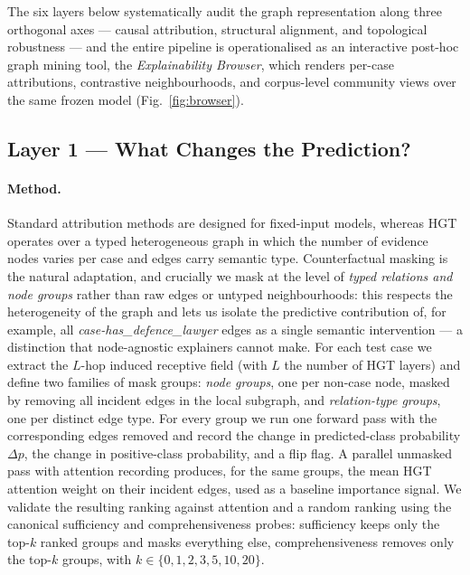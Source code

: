 \documentclass[runningheads]{llncs}
\begin{document}
The six layers below systematically audit the graph representation along three orthogonal axes --- causal attribution, structural alignment, and topological robustness --- and the entire pipeline is operationalised as an interactive post-hoc graph mining tool, the \emph{Explainability Browser}, which renders per-case attributions, contrastive neighbourhoods, and corpus-level community views over the same frozen model (Fig.~\ref{fig:browser}).


\subsection{Layer 1 --- What Changes the Prediction?}
\label{subsec:exp-attribution}

\paragraph{Method.} Standard attribution methods are designed for fixed-input models, whereas HGT operates over a typed heterogeneous graph in which the number of evidence nodes varies per case and edges carry semantic type. Counterfactual masking is the natural adaptation, and crucially we mask at the level of \emph{typed relations and node groups} rather than raw edges or untyped neighbourhoods: this respects the heterogeneity of the graph and lets us isolate the predictive contribution of, for example, all \emph{case-has\_defence\_lawyer} edges as a single semantic intervention --- a distinction that node-agnostic explainers cannot make. For each test case we extract the $L$-hop induced receptive field (with $L$ the number of HGT layers) and define two families of mask groups: \emph{node groups}, one per non-case node, masked by removing all incident edges in the local subgraph, and \emph{relation-type groups}, one per distinct edge type. For every group we run one forward pass with the corresponding edges removed and record the change in predicted-class probability $\Delta p$, the change in positive-class probability, and a flip flag. A parallel unmasked pass with attention recording produces, for the same groups, the mean HGT attention weight on their incident edges, used as a baseline importance signal. We validate the resulting ranking against attention and a random ranking using the canonical sufficiency and comprehensiveness probes: sufficiency keeps only the top-$k$ ranked groups and masks everything else, comprehensiveness removes only the top-$k$ groups, with $k \in \{0,1,2,3,5,10,20\}$.
\end{document}

